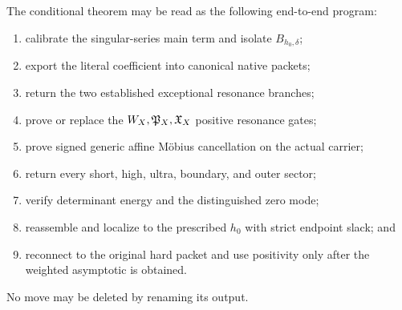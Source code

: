 The conditional theorem may be read as the following end-to-end
program:
\begin{enumerate}[leftmargin=2em]
\item calibrate the singular-series main term and isolate
  \(B_{h_0,\delta}\);
\item export the literal coefficient into canonical native packets;
\item return the two established exceptional resonance branches;
\item prove or replace the \(W_X,\mathfrak P_X,\mathfrak X_X\) positive resonance gates;
\item prove signed generic affine M\"obius cancellation on the actual
  carrier;
\item return every short, high, ultra, boundary, and outer sector;
\item verify determinant energy and the distinguished zero mode;
\item reassemble and localize to the prescribed \(h_0\) with strict
  endpoint slack; and
\item reconnect to the original hard packet and use positivity only
  after the weighted asymptotic is obtained.
\end{enumerate}
No move may be deleted by renaming its output.
